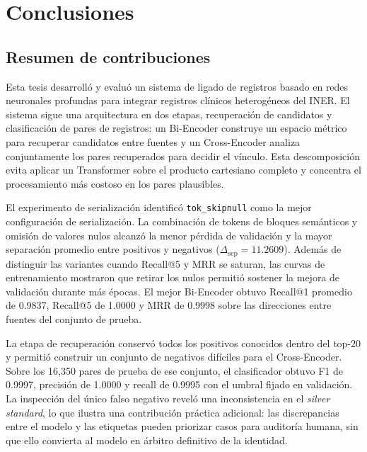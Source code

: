 
\chapter{Conclusiones}

\section{Resumen de contribuciones}

Esta tesis desarrolló y evaluó un sistema de ligado de registros basado en redes neuronales profundas para integrar registros clínicos heterogéneos del INER. El sistema sigue una arquitectura en dos etapas, recuperación de candidatos y clasificación de pares de registros: un Bi-Encoder construye un espacio métrico para recuperar candidatos entre fuentes y un Cross-Encoder analiza conjuntamente los pares recuperados para decidir el vínculo. Esta descomposición evita aplicar un Transformer sobre el producto cartesiano completo y concentra el procesamiento más costoso en los pares plausibles.

El experimento de serialización identificó \texttt{tok\_skipnull} como la mejor configuración de serialización. La combinación de tokens de bloques semánticos y omisión de valores nulos alcanzó la menor pérdida de validación y la mayor separación promedio entre positivos y negativos ($\Delta_{\mathrm{sep}}=11.2609$). Además de distinguir las variantes cuando Recall@5 y MRR se saturan, las curvas de entrenamiento mostraron que retirar los nulos permitió sostener la mejora de validación durante más épocas. El mejor Bi-Encoder obtuvo Recall@1 promedio de 0.9837, Recall@5 de 1.0000 y MRR de 0.9998 sobre las direcciones entre fuentes del conjunto de prueba.

La etapa de recuperación conservó todos los positivos conocidos dentro del top-$20$ y permitió construir un conjunto de negativos difíciles para el Cross-Encoder. Sobre los 16,350 pares de prueba de ese conjunto, el clasificador obtuvo F1 de 0.9997, precisión de 1.0000 y recall de 0.9995 con el umbral fijado en validación. La inspección del único falso negativo reveló una inconsistencia en el \textit{silver standard}, lo que ilustra una contribución práctica adicional: las discrepancias entre el modelo y las etiquetas pueden priorizar casos para auditoría humana, sin que ello convierta al modelo en árbitro definitivo de la identidad.

